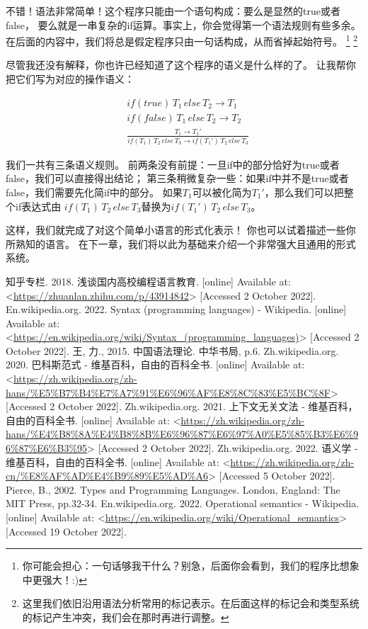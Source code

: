 \documentclass[../main.tex]{subfiles}
\begin{document}
  \indent 不错！语法非常简单！这个程序只能由一个语句构成：要么是显然的true或者false，
  要么就是一串复杂的if运算。事实上，你会觉得第一个语法规则有些多余。
  在后面的内容中，我们将总是假定程序只由一句话构成，从而省掉起始符号。
  \footnote[2]{你可能会担心：一句话够我干什么？别急，后面你会看到，我们的程序比想象中更强大！:)}
  \footnote[3]{这里我们依旧沿用语法分析常用的标记表示。在后面这样的标记会和类型系统的标记产生冲突，我们会在那时再进行调整。}

  \indent 尽管我还没有解释，你也许已经知道了这个程序的语义是什么样的了。
  让我帮你把它们写为对应的操作语义：

  \begin{eqnarray}
    & if (true)\, T_1\,else\,T_2 \to T_1 \nonumber \\
    & if (false)\, T_1\,else\,T_2 \to T_2 \nonumber \\
    & \frac{T_1 \to T_1'}{if(T_1)\,T_2\,else\,T_3 \to if(T_1')\,T_2\,else\,T_3} \nonumber
  \end{eqnarray}

  \indent 我们一共有三条语义规则。
  前两条没有前提：一旦if中的部分恰好为true或者false，我们可以直接得出结论；
  第三条稍微复杂一些：如果if中并不是true或者false，我们需要先化简if中的部分。
  如果$T_1$可以被化简为$T_1'$，那么我们可以把整个if表达式由
  $if(T_1)\,T_2\,else\,T_3$替换为$if(T_1')\,T_2\,else\,T_3$。

  \indent 这样，我们就完成了对这个简单小语言的形式化表示！
  你也可以试着描述一些你所熟知的语言。
  在下一章，我们将以此为基础来介绍一个非常强大且通用的形式系统。

  \begin{thebibliography}{8}
     知乎专栏. 2018. 浅谈国内高校编程语言教育. [online] Available at: <\url{https://zhuanlan.zhihu.com/p/43914842}> [Accessed 2 October 2022].
     En.wikipedia.org. 2022. Syntax (programming languages) - Wikipedia. [online] Available at: <\url{https://en.wikipedia.org/wiki/Syntax_(programming_languages)}> [Accessed 2 October 2022].
     王, 力., 2015. 中国语法理论. 中华书局, p.6.
     Zh.wikipedia.org. 2020. 巴科斯范式 - 维基百科，自由的百科全书. [online] Available at: <\url{https://zh.wikipedia.org/zh-hans/%E5%B7%B4%E7%A7%91%E6%96%AF%E8%8C%83%E5%BC%8F}> [Accessed 2 October 2022]. 
     Zh.wikipedia.org. 2021. 上下文无关文法 - 维基百科，自由的百科全书. [online] Available at: <\url{https://zh.wikipedia.org/zh-hans/%E4%B8%8A%E4%B8%8B%E6%96%87%E6%97%A0%E5%85%B3%E6%96%87%E6%B3%95}> [Accessed 2 October 2022].
     Zh.wikipedia.org. 2022. 语义学 - 维基百科，自由的百科全书. [online] Available at: <\url{https://zh.wikipedia.org/zh-cn/%E8%AF%AD%E4%B9%89%E5%AD%A6}> [Accessed 5 October 2022].
     Pierce, B., 2002. Types and Programming Languages. London, England: The MIT Press, pp.32-34.
     En.wikipedia.org. 2022. Operational semantics - Wikipedia. [online] Available at: <\url{https://en.wikipedia.org/wiki/Operational_semantics}> [Accessed 19 October 2022].
  \end{thebibliography}
\end{document}
